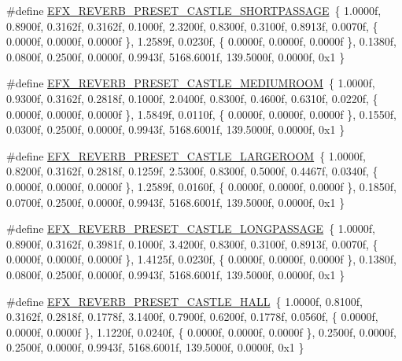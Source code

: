 \begin{DoxyCompactItemize}
\item 
\#define \hyperlink{efx-presets_8h_a2bdb9324de8ff86ae224937cca35a78e}{E\+F\+X\+\_\+\+R\+E\+V\+E\+R\+B\+\_\+\+P\+R\+E\+S\+E\+T\+\_\+\+C\+A\+S\+T\+L\+E\+\_\+\+S\+H\+O\+R\+T\+P\+A\+S\+S\+A\+GE}~\{ 1.\+0000f, 0.\+8900f, 0.\+3162f, 0.\+3162f, 0.\+1000f, 2.\+3200f, 0.\+8300f, 0.\+3100f, 0.\+8913f, 0.\+0070f, \{ 0.\+0000f, 0.\+0000f, 0.\+0000f \}, 1.\+2589f, 0.\+0230f, \{ 0.\+0000f, 0.\+0000f, 0.\+0000f \}, 0.\+1380f, 0.\+0800f, 0.\+2500f, 0.\+0000f, 0.\+9943f, 5168.\+6001f, 139.\+5000f, 0.\+0000f, 0x1 \}
\item 
\#define \hyperlink{efx-presets_8h_a05f6c31dbfd01ed6ecaf580a5772a506}{E\+F\+X\+\_\+\+R\+E\+V\+E\+R\+B\+\_\+\+P\+R\+E\+S\+E\+T\+\_\+\+C\+A\+S\+T\+L\+E\+\_\+\+M\+E\+D\+I\+U\+M\+R\+O\+OM}~\{ 1.\+0000f, 0.\+9300f, 0.\+3162f, 0.\+2818f, 0.\+1000f, 2.\+0400f, 0.\+8300f, 0.\+4600f, 0.\+6310f, 0.\+0220f, \{ 0.\+0000f, 0.\+0000f, 0.\+0000f \}, 1.\+5849f, 0.\+0110f, \{ 0.\+0000f, 0.\+0000f, 0.\+0000f \}, 0.\+1550f, 0.\+0300f, 0.\+2500f, 0.\+0000f, 0.\+9943f, 5168.\+6001f, 139.\+5000f, 0.\+0000f, 0x1 \}
\item 
\#define \hyperlink{efx-presets_8h_a2cbeb7be51ded88e22bd3fc898c26dfe}{E\+F\+X\+\_\+\+R\+E\+V\+E\+R\+B\+\_\+\+P\+R\+E\+S\+E\+T\+\_\+\+C\+A\+S\+T\+L\+E\+\_\+\+L\+A\+R\+G\+E\+R\+O\+OM}~\{ 1.\+0000f, 0.\+8200f, 0.\+3162f, 0.\+2818f, 0.\+1259f, 2.\+5300f, 0.\+8300f, 0.\+5000f, 0.\+4467f, 0.\+0340f, \{ 0.\+0000f, 0.\+0000f, 0.\+0000f \}, 1.\+2589f, 0.\+0160f, \{ 0.\+0000f, 0.\+0000f, 0.\+0000f \}, 0.\+1850f, 0.\+0700f, 0.\+2500f, 0.\+0000f, 0.\+9943f, 5168.\+6001f, 139.\+5000f, 0.\+0000f, 0x1 \}
\item 
\#define \hyperlink{efx-presets_8h_a1861da1622216f2adc3d5183456760c9}{E\+F\+X\+\_\+\+R\+E\+V\+E\+R\+B\+\_\+\+P\+R\+E\+S\+E\+T\+\_\+\+C\+A\+S\+T\+L\+E\+\_\+\+L\+O\+N\+G\+P\+A\+S\+S\+A\+GE}~\{ 1.\+0000f, 0.\+8900f, 0.\+3162f, 0.\+3981f, 0.\+1000f, 3.\+4200f, 0.\+8300f, 0.\+3100f, 0.\+8913f, 0.\+0070f, \{ 0.\+0000f, 0.\+0000f, 0.\+0000f \}, 1.\+4125f, 0.\+0230f, \{ 0.\+0000f, 0.\+0000f, 0.\+0000f \}, 0.\+1380f, 0.\+0800f, 0.\+2500f, 0.\+0000f, 0.\+9943f, 5168.\+6001f, 139.\+5000f, 0.\+0000f, 0x1 \}
\item 
\#define \hyperlink{efx-presets_8h_a849c407784f05de02d3c3fdff68e573a}{E\+F\+X\+\_\+\+R\+E\+V\+E\+R\+B\+\_\+\+P\+R\+E\+S\+E\+T\+\_\+\+C\+A\+S\+T\+L\+E\+\_\+\+H\+A\+LL}~\{ 1.\+0000f, 0.\+8100f, 0.\+3162f, 0.\+2818f, 0.\+1778f, 3.\+1400f, 0.\+7900f, 0.\+6200f, 0.\+1778f, 0.\+0560f, \{ 0.\+0000f, 0.\+0000f, 0.\+0000f \}, 1.\+1220f, 0.\+0240f, \{ 0.\+0000f, 0.\+0000f, 0.\+0000f \}, 0.\+2500f, 0.\+0000f, 0.\+2500f, 0.\+0000f, 0.\+9943f, 5168.\+6001f, 139.\+5000f, 0.\+0000f, 0x1 \}

\end{DoxyCompactItemize}
